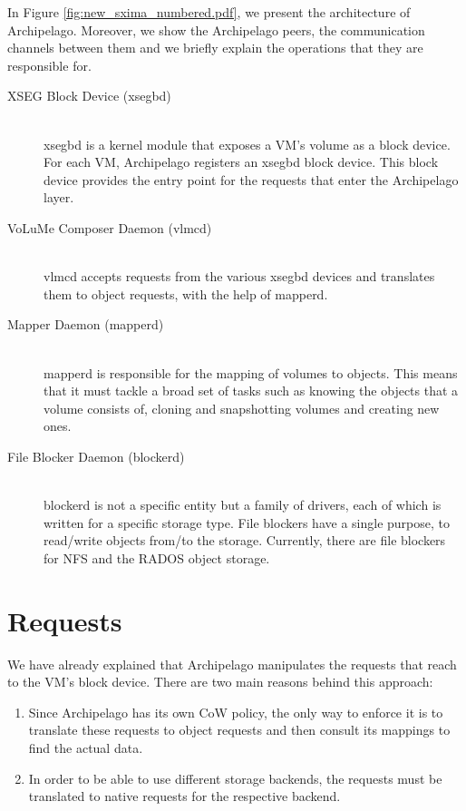 In Figure \ref{fig:new_sxima_numbered.pdf}, we present the architecture of 
Archipelago.  Moreover, we show the Archipelago peers, the communication 
channels between them and we briefly explain the operations that they are 
responsible for.


\begin{description}
	\item[XSEG Block Device (xsegbd)] \hfill \\
		xsegbd is a kernel module that exposes a VM's volume as a block 
		device. For each VM, Archipelago registers an xsegbd block 
		device. This block device provides the entry point for the 
		requests that enter the Archipelago layer.
	\item[VoLuMe Composer Daemon (vlmcd)] \hfill \\
		vlmcd accepts requests from the various xsegbd devices and 
		translates them to object requests, with the help of mapperd.
	\item[Mapper Daemon (mapperd)] \hfill \\
		mapperd is responsible for the mapping of volumes to objects.  
		This means that it must tackle a broad set of tasks such as 
		knowing the objects that a volume consists of, cloning and 
		snapshotting volumes and creating new ones.
	\item[File Blocker Daemon (blockerd)] \hfill \\
		blockerd is not a specific entity but a family of drivers, each 
		of which is written for a specific storage type. File blockers 
		have a single purpose, to read/write objects from/to the 
		storage. Currently, there are file blockers for NFS and the 
		RADOS object storage.
\end{description}

\section{Requests}

We have already explained that Archipelago manipulates the requests that reach 
to the VM's block device. There are two main reasons behind this approach:

\begin{enumerate}
	\item Since Archipelago has its own CoW policy, the only way to enforce 
		it is to translate these requests to object requests and then 
		consult its mappings to find the actual data.
	\item In order to be able to use different storage backends, the 
		requests must be translated to native requests for the 
		respective backend.
\end{enumerate}

